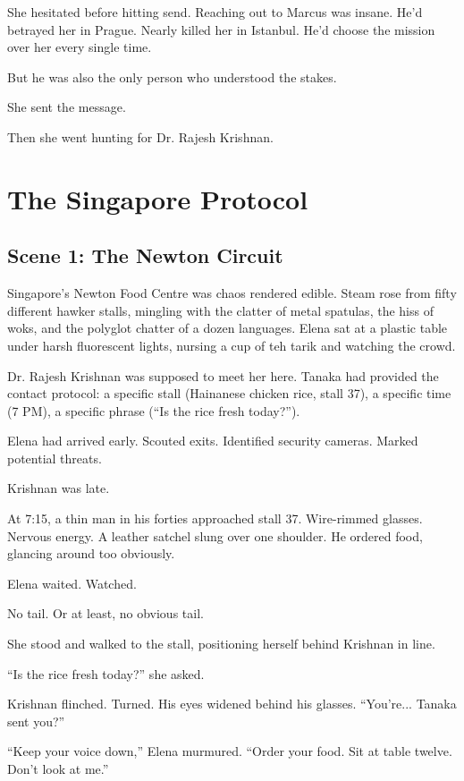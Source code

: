 \documentclass[12pt,oneside]{book}
\begin{document}
She hesitated before hitting send. Reaching out to Marcus was insane. He'd betrayed her in Prague. Nearly killed her in Istanbul. He'd choose the mission over her every single time.

But he was also the only person who understood the stakes.

She sent the message.

Then she went hunting for Dr. Rajesh Krishnan.

\newpage
\chapter{The Singapore Protocol}

\section*{Scene 1: The Newton Circuit}

Singapore's Newton Food Centre was chaos rendered edible. Steam rose from fifty different hawker stalls, mingling with the clatter of metal spatulas, the hiss of woks, and the polyglot chatter of a dozen languages. Elena sat at a plastic table under harsh fluorescent lights, nursing a cup of teh tarik and watching the crowd.

Dr. Rajesh Krishnan was supposed to meet her here. Tanaka had provided the contact protocol: a specific stall (Hainanese chicken rice, stall 37), a specific time (7 PM), a specific phrase (``Is the rice fresh today?'').

Elena had arrived early. Scouted exits. Identified security cameras. Marked potential threats.

Krishnan was late.

At 7:15, a thin man in his forties approached stall 37. Wire-rimmed glasses. Nervous energy. A leather satchel slung over one shoulder. He ordered food, glancing around too obviously.

Elena waited. Watched.

No tail. Or at least, no obvious tail.

She stood and walked to the stall, positioning herself behind Krishnan in line.

``Is the rice fresh today?'' she asked.

Krishnan flinched. Turned. His eyes widened behind his glasses. ``You're... Tanaka sent you?''

``Keep your voice down,'' Elena murmured. ``Order your food. Sit at table twelve. Don't look at me.''
\end{document}
